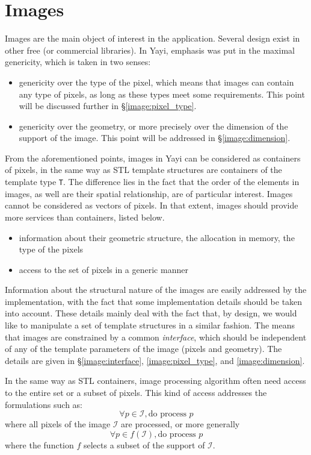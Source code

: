 \chapter{Images}
\label{chap:image;structure}

Images are the main object of interest in the application. Several design exist in other free (or commercial libraries). In Yayi, emphasis was put in the maximal genericity, which is taken in two senses:
\begin{itemize}
\item genericity over the type of the pixel, which means that images can contain any type of pixels, as long as these types meet some requirements. This point will be discussed further in \S \ref{image:pixel_type}.
\item genericity over the geometry, or more precisely over the dimension of the support of the image. This point will be addressed in \S \ref{image:dimension}.
\end{itemize}

From the aforementioned points, images in Yayi can be considered as containers of pixels, in the same way as STL template structures are containers of the template type \lstinline|T|. The difference lies in the fact that the order of the elements in images, as well are their spatial relationship, are of particular interest. Images cannot be considered as vectors of pixels. In that extent, images should provide more services than containers, listed below. 

\begin{itemize}
\item information about their geometric structure, the allocation in memory, the type of the pixels
\item access to the set of pixels in a generic manner
\end{itemize}

Information about the structural nature of the images are easily addressed by the implementation, with the fact that some implementation details should be taken into account. These details mainly deal with the fact that, by design, we would like to manipulate a set of template structures in a similar fashion. The means that images are constrained by a common \textit{interface}, which should be independent of any of the template parameters of the image (pixels and geometry). The details are given in \S \ref{image:interface}, \ref{image:pixel_type}, and \ref{image:dimension}.

In the same way as STL containers, image processing algorithm often need access to the entire set or a subset of pixels. This kind of access addresses the formulations such as:
\[
\forall p \in \mathcal{I}, \text{do process } p
\]
where all pixels of the image $\mathcal{I}$ are processed, or more generally
\[
\forall p \in f(\mathcal{I}), \text{do process } p
\]
where the function $f$ selects a subset of the support of $\mathcal{I}$. 

